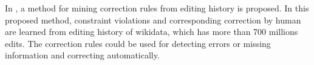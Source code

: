 \documentclass{article}
\begin{document}
In \cite{pellissier_tanon_learning_2019}, a method for mining correction rules from editing history is proposed. In this proposed method, constraint violations and corresponding correction by human are learned from editing history of wikidata, which has more than 700 millions edits. The correction rules could be used for detecting errors or missing information and correcting automatically.   

\newpage



\end{document}
